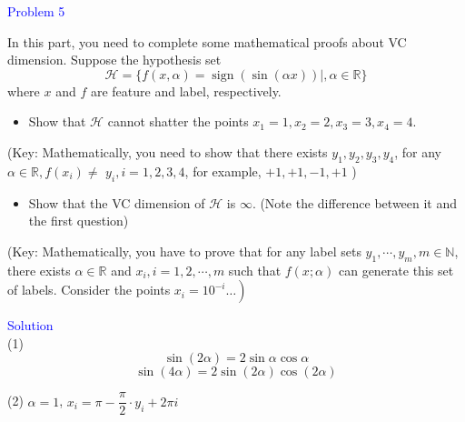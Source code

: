 \textcolor{blue}{Problem 5}

In this part, you need to complete some mathematical proofs about VC dimension. Suppose the hypothesis set
$$
\mathcal{H}=\{f(x, \alpha)=\operatorname{sign}(\sin (\alpha x)) \mid, \alpha \in \mathbb{R}\}
$$
where $x$ and $f$ are feature and label, respectively.
\begin{itemize}
    \item Show that $\mathcal{H}$ cannot shatter the points $x_1=1, x_2=2, x_3=3, x_4=4$.
\end{itemize}
(Key: Mathematically, you need to show that there exists $y_1, y_2, y_3, y_4$, for any $\alpha \in \mathbb{R}, f\left(x_i\right) \neq$ $y_i, i=1,2,3,4$, for example, $+1,+1,-1,+1$ )
\begin{itemize}
\item Show that the VC dimension of $\mathcal{H}$ is $\infty$. (Note the difference between it and the first question)
\end{itemize}
(Key: Mathematically, you have to prove that for any label sets $y_1, \cdots, y_m, m \in \mathbb{N}$, there exists $\alpha \in \mathbb{R}$ and $x_i, i=1,2, \cdots, m$ such that $f(x ; \alpha)$ can generate this set of labels. Consider the points $\left.x_i=10^{-i} \ldots\right)$

\textcolor{blue}{Solution}\\
(1) 
$$\sin(2\alpha)=2\sin\alpha\cos\alpha$$
$$\sin(4\alpha)=2\sin(2\alpha)\cos(2\alpha)$$











(2)
$\alpha=1$, $x_i=\pi-\dfrac{\pi}{2}\cdot y_i+2\pi i$\\





